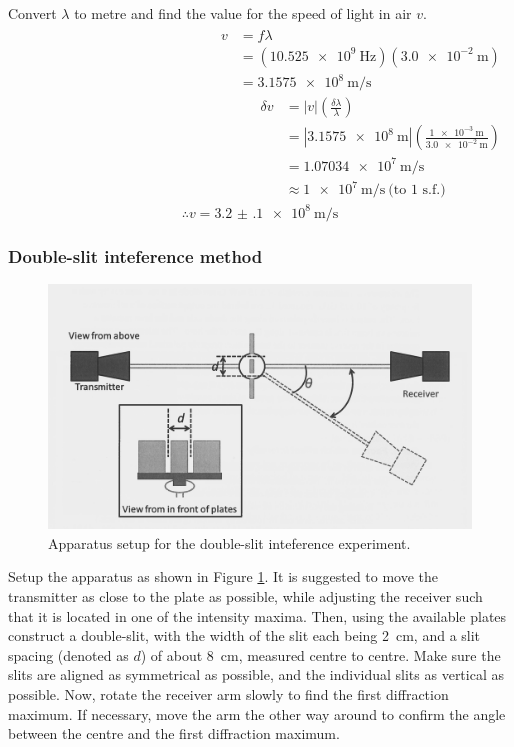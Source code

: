 \documentclass[letter,12pt]{article}
\newcommand{\tlambda}{\(\lambda\) }
\numberwithin{equation}{section}
\numberwithin{figure}{section}
\numberwithin{table}{section}
\begin{document}
Convert \tlambda to metre and find the value for the speed of light in air \(v\).
\begin{align*}
  \begin{split}
    v &= f \lambda \\
    &= (\SI{10.525e9}{\hertz})(\SI{3.0e-2}{\m}) \\
    &= \SI{3.1575e8}{\m\per\s}
  \end{split}
  \begin{split}
    \delta v &= |v| \left( \frac{\delta \lambda}{\lambda} \right) \\
    &= |\SI{3.1575e8}{\m}| \left( \frac{\SI{1e-3}{\m}}{\SI{3.0e-2}{\m}} \right) \\
    &= \SI{1.07034e7}{\m\per\s} \\
    &\approx \SI{1e7}{\m\per\s} \ \text{(to 1 s.f.)}
  \end{split}
\end{align*}
\[\therefore v = \SI{3.2(1)e8}{\m\per\s}\]

\subsubsection{Double-slit inteference method}
\begin{figure}
  \centering
  \includegraphics[width=\textwidth]{Double-slit.png}
  \caption{Apparatus setup for the double-slit inteference experiment.}
  \label{fig:e1}
\end{figure}
Setup the apparatus as shown in Figure \ref{fig:e1}. It is suggested to move the transmitter as close to the plate as possible, while adjusting the receiver such that it is located in one of the intensity maxima. Then, using the available plates construct a double-slit, with the width of the slit each being \SI{2}{\cm}, and a slit spacing (denoted as \(d\)) of about \SI{8}{\cm}, measured centre to centre. Make sure the slits are aligned as symmetrical as possible, and the individual slits as vertical as possible. Now, rotate the receiver arm slowly to find the first diffraction maximum. If necessary, move the arm the other way around to confirm the angle between the centre and the first diffraction maximum.
\end{document}
